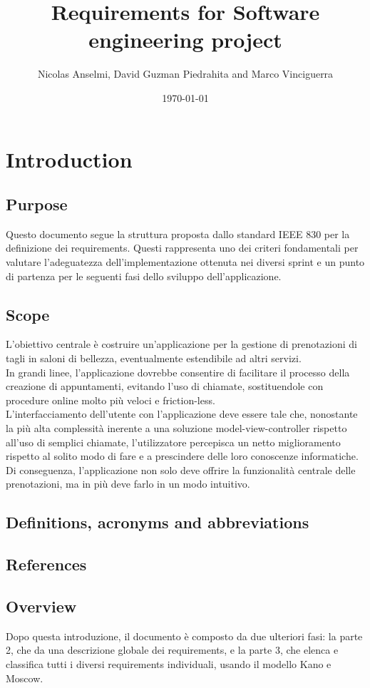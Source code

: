 \documentclass{article}
\title{Requirements for Software engineering project}
\author{Nicolas Anselmi, David Guzman Piedrahita and Marco Vinciguerra}
\date{\today}
\begin{document}
\maketitle

\section{Introduction}

\subsection{Purpose} 
Questo documento segue la struttura proposta dallo standard IEEE 830 per la definizione dei requirements. Questi rappresenta uno dei criteri fondamentali per valutare l’adeguatezza dell’implementazione ottenuta nei diversi sprint e un punto di partenza per le seguenti fasi dello sviluppo dell’applicazione.
\subsection{Scope}
L’obiettivo centrale è costruire un’applicazione per la gestione di prenotazioni di tagli in saloni di bellezza, eventualmente estendibile ad altri servizi. 
\\In grandi linee, l’applicazione dovrebbe consentire di facilitare il processo della creazione di appuntamenti, evitando l’uso di chiamate, sostituendole con procedure online molto più veloci e friction-less. 
\\L’interfacciamento dell’utente con l’applicazione deve essere tale che, nonostante la più alta complessità inerente a una soluzione model-view-controller rispetto all’uso di semplici chiamate, l’utilizzatore percepisca un netto miglioramento rispetto al solito modo di fare e a prescindere delle loro conoscenze informatiche. 
\\Di conseguenza, l’applicazione non solo deve offrire la funzionalità centrale delle prenotazioni, ma in più deve farlo in un modo intuitivo. 

\subsection {Definitions, acronyms and abbreviations }
\subsection {References} 
\subsection {Overview} 
Dopo questa introduzione, il documento è composto da due ulteriori fasi: la parte 2, che da una descrizione globale dei requirements, e la parte 3, che elenca e classifica tutti i diversi requirements individuali, usando il modello Kano e Moscow.
\end{document}

